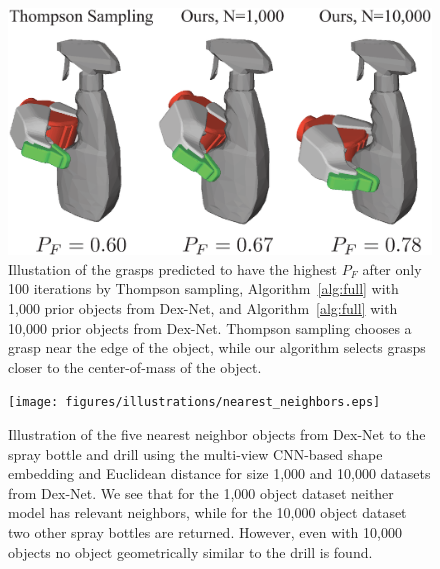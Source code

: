 \begin{figure}[t!]
\centering
\includegraphics[scale=0.28]{figures/illustrations/spray_grasps.eps}
\caption{Illustation of the grasps predicted to have the highest $P_F$ after only 100 iterations by Thompson sampling, Algorithm~\ref{alg:full} with 1,000 prior objects from Dex-Net, and Algorithm~\ref{alg:full} with 10,000 prior objects from Dex-Net. Thompson sampling chooses a grasp near the edge of the object, while our algorithm selects grasps closer to the center-of-mass of the object.}
\vspace*{-5pt}
\end{figure}

\begin{figure}[t!]
\centering
\texttt{[image: figures/illustrations/nearest\_neighbors.eps]}
\caption{Illustration of the five nearest neighbor objects from Dex-Net to the spray bottle and drill using the multi-view CNN-based shape embedding and Euclidean distance for size 1,000 and 10,000 datasets from Dex-Net. We see that for the 1,000 object dataset neither model has relevant neighbors, while for the 10,000 object dataset two other spray bottles are returned. However, even with 10,000 objects no object geometrically similar to the drill is found. }
\vspace*{-5pt}
\end{figure}

